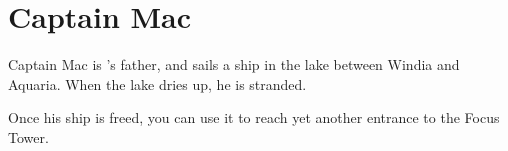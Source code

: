 \section{Captain Mac}
\label{char:mac}


Captain Mac is 's father, and sails a ship in the lake between Windia and Aquaria. When the lake dries up, he is stranded.

Once his ship is freed, you can use it to reach yet another entrance to the Focus Tower.
